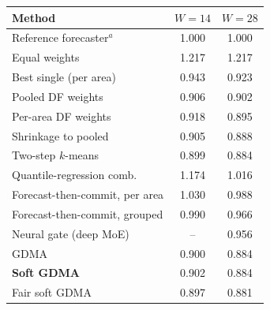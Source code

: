 \begin{tabular}{@{}lcc@{}}
\toprule
Method & $W=14$ & $W=28$ \\
\midrule
Reference forecaster$^a$ & 1.000 & 1.000 \\
Equal weights & 1.217 & 1.217 \\
Best single (per area) & 0.943 & 0.923 \\
Pooled DF weights & 0.906 & 0.902 \\
Per-area DF weights & 0.918 & 0.895 \\
Shrinkage to pooled & 0.905 & 0.888 \\
Two-step $k$-means & 0.899 & 0.884 \\
Quantile-regression comb. & 1.174 & 1.016 \\
Forecast-then-commit, per area & 1.030 & 0.988 \\
Forecast-then-commit, grouped & 0.990 & 0.966 \\
Neural gate (deep MoE) & -- & 0.956 \\
GDMA & 0.900 & 0.884 \\
\textbf{Soft GDMA} & 0.902 & 0.884 \\
Fair soft GDMA & 0.897 & 0.881 \\
\bottomrule
\end{tabular}